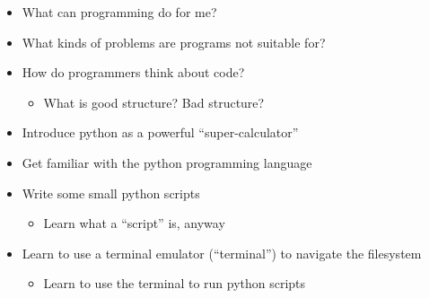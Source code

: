 

\begin{itemize}
    \item What can programming do for me?
    \item What kinds of problems are programs not suitable for?
    \item How do programmers think about code?
    \begin{itemize}
        \item What is good structure? Bad structure?
    \end{itemize}
\end{itemize}

\begin{itemize}
    \item Introduce python as a powerful ``super-calculator''
    \item Get familiar with the python programming language
    \item Write some small python scripts
    \begin{itemize}
        \item Learn what a ``script'' is, anyway
    \end{itemize}
    \item Learn to use a terminal emulator (``terminal'') to navigate the filesystem
    \begin{itemize}
        \item Learn to use the terminal to run python scripts
    \end{itemize}
\end{itemize}


